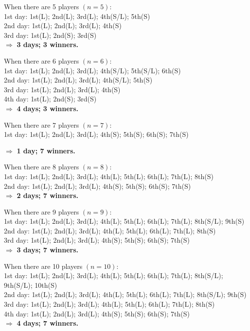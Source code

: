 \documentclass[12pt]{article}
\begin{document}
\noindent When there are 5 players $\displaystyle (n=5)$:\\
\noindent 1st day: 1st(L); 2nd(L); 3rd(L); 4th(S/L); 5th(S) \\
\noindent 2nd day: 1st(L); 2nd(L); 3rd(L); 4th(S) \\
\noindent 3rd day: 1st(L); 2nd(S); 3rd(S) \\
$\Longrightarrow$ \textbf{3 days; 3 winners.}\par
    
\noindent When there are 6 players $\displaystyle (n=6)$:\\
\noindent 1st day: 1st(L); 2nd(L); 3rd(L); 4th(S/L); 5th(S/L); 6th(S) \\
\noindent 2nd day: 1st(L); 2nd(L); 3rd(L); 4th(S/L); 5th(S) \\
\noindent 3rd day: 1st(L); 2nd(L); 3rd(L); 4th(S) \\
\noindent 4th day: 1st(L); 2nd(S); 3rd(S) \\
$\Longrightarrow$ \textbf{4 days; 3 winners.}\par
    
\noindent When there are 7 players $\displaystyle (n=7)$:\\
\noindent 1st day: 1st(L); 2nd(L); 3rd(L); 4th(S); 5th(S); 6th(S); 7th(S) \par
$\Longrightarrow$ \textbf{1 day; 7 winners.} \par
    
\noindent When there are 8 players $\displaystyle (n=8)$:\\
\noindent 1st day: 1st(L); 2nd(L); 3rd(L); 4th(L); 5th(L); 6th(L); 7th(L); 8th(S) \\
\noindent 2nd day: 1st(L); 2nd(L); 3rd(L); 4th(S); 5th(S); 6th(S); 7th(S) \\
$\Longrightarrow$ \textbf{2 days; 7 winners.}\par
    
\noindent When there are 9 players $\displaystyle (n=9)$:\\
\noindent 1st day: 1st(L); 2nd(L); 3rd(L); 4th(L); 5th(L); 6th(L); 7th(L); 8th(S/L); 9th(S) \\
\noindent 2nd day: 1st(L); 2nd(L); 3rd(L); 4th(L); 5th(L); 6th(L); 7th(L); 8th(S) \\
\noindent 3rd day: 1st(L); 2nd(L); 3rd(L); 4th(S); 5th(S); 6th(S); 7th(S) \\
$\Longrightarrow$ \textbf{3 days; 7 winners.}\par
    
\noindent When there are 10 players $\displaystyle (n=10)$:\\
\noindent 1st day: 1st(L); 2nd(L); 3rd(L); 4th(L); 5th(L); 6th(L); 7th(L); 8th(S/L); 9th(S/L); 10th(S) \\
\noindent 2nd day: 1st(L); 2nd(L); 3rd(L); 4th(L); 5th(L); 6th(L); 7th(L); 8th(S/L); 9th(S) \\
\noindent 3rd day: 1st(L); 2nd(L); 3rd(L); 4th(L); 5th(L); 6th(L); 7th(L); 8th(S) \\
\noindent 4th day: 1st(L); 2nd(L); 3rd(L); 4th(S); 5th(S); 6th(S); 7th(S) \\
$\Longrightarrow$ \textbf{4 days; 7 winners.}\par
\end{document}

